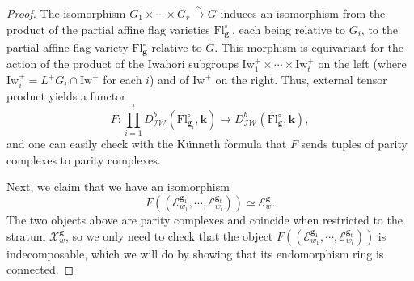 \documentclass[11pt]{amsart}
\theoremstyle{plain}
\theoremstyle{remark}
\numberwithin{equation}{section}
\begin{document}
	\begin{proof}
		 The isomorphism $G_1\times\cdots\times G_r\xrightarrow{\sim} G$ induces an  isomorphism from the product of the partial affine flag varieties $\mathrm{Fl}^{\circ}_{\mathbf{g}_i}$, each being relative to $G_i$, to the partial affine flag variety $\mathrm{Fl}^{\circ}_{\mathbf{g}}$ relative to $G$. This morphism is equivariant for the action of the product of the Iwahori subgroups $\mathrm{Iw}^+_1\times\cdots\times \mathrm{Iw}^+_t$ on the left (where $\mathrm{Iw}^+_i=L^+G_i\cap \mathrm{Iw}^+$ for each $i$) and of $\mathrm{Iw}^+$ on the right. Thus, external tensor product yields a functor
		\begin{equation*}
			F:\prod _{i=1}^tD^b_{\mathcal{IW}}(\mathrm{Fl}^{\circ}_{\mathbf{g}_i},\mathbf{k})  \to D^b_{\mathcal{IW}}(\mathrm{Fl}^{\circ}_{\mathbf{g}},\mathbf{k}),
		\end{equation*}
		and one can easily check with the Künneth formula that $F$ sends tuples of parity complexes to parity complexes. 
		
		Next, we claim that we have an isomorphism 
		\begin{equation*}
			F((\mathcal{E}_{w_1}^{\mathbf{g}_1},\cdots,\mathcal{E}_{w_t}^{\mathbf{g}_t}))\simeq \mathcal{E}_w^\mathbf{g}.
		\end{equation*}
		The two objects above are parity complexes and coincide when restricted to the stratum $\mathscr{X}^\mathbf{g}_w$, so we only need to check that the object $F((\mathcal{E}_{w_1}^{\mathbf{g}_1},\cdots,\mathcal{E}_{w_t}^{\mathbf{g}_t}))$ is indecomposable, which we will do by showing that its endomorphism ring is connected. 
		

\end{proof}
\end{document}

